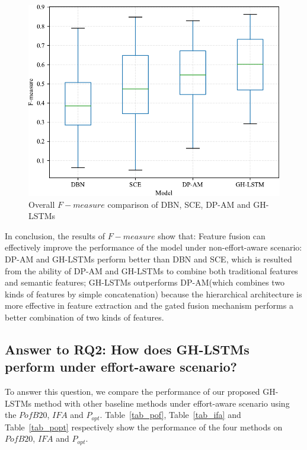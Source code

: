\documentclass[journal]{IEEEtran}
\begin{document}
\begin{figure}[htbp]
	\centering
	\includegraphics[scale=0.6]{figs/box_F-measure.pdf}
	\caption{Overall $F-measure$ comparison of DBN, SCE, DP-AM and GH-LSTMs}
	\label{fig_box_F-measure}
\end{figure}

In conclusion, the results of $F-measure$ show that: Feature fusion can effectively improve the performance of the model under non-effort-aware scenario: DP-AM and GH-LSTMs perform better than DBN and SCE, which is resulted from the ability of DP-AM and GH-LSTMs to combine both traditional features and semantic features; GH-LSTMs outperforms DP-AM(which combines two kinds of features by simple concatenation) because the hierarchical architecture is more effective in feature extraction and the gated fusion mechanism performs a better combination of two kinds of features.

\subsection{Answer to RQ2: How does GH-LSTMs perform under effort-aware scenario?}
To answer this question, we compare the performance of our proposed GH-LSTMs method with other baseline methods under effort-aware scenario using the $PofB20$, $IFA$ and $P_{opt}$. Table~\ref{tab_pof}, Table~\ref{tab_ifa} and Table~\ref{tab_popt} respectively show the performance of the four methods on $PofB20$, $IFA$ and $P_{opt}$.
\end{document}
